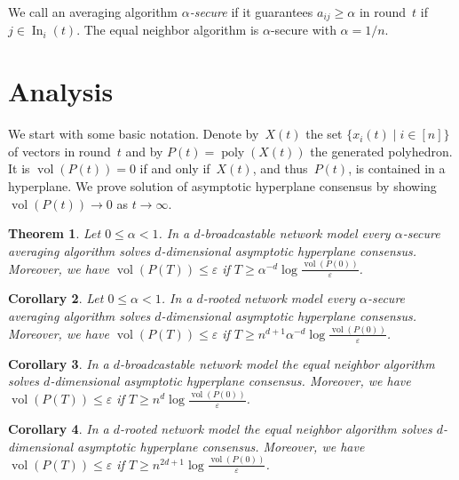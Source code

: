 \documentclass{article}
\newtheorem{thm}{Theorem}
\newtheorem{cor}[thm]{Corollary}
\DeclareMathOperator{\vol}{vol}
\renewcommand{\leq}{\leqslant}
\renewcommand{\geq}{\geqslant}
\DeclareMathOperator\In{In}
\DeclareMathOperator\poly{poly}
\begin{document}

We call an averaging algorithm \emph{$\alpha$-secure} if it guarantees
$a_{ij}\geq \alpha$ in round~$t$ if $j\in \In_i(t)$.
The equal neighbor algorithm is $\alpha$-secure with $\alpha = 1/n$.
  


\section{Analysis}\label{sec:analysis}

We start with some basic notation.
Denote by~$X(t)$ the set
$\{ x_i(t) \mid i \in [n] \}$
of vectors in round~$t$
and 
by
$P(t) = \poly(X(t))$ the generated polyhedron.
It is $\vol(P(t)) = 0$ if and only if~$X(t)$, and thus~$P(t)$, is contained in a hyperplane.
We prove solution of asymptotic hyperplane consensus by showing $\vol(P(t)) \to 0$ as $t\to\infty$.

\begin{thm}\label{thm:poss}
Let $0\leq \alpha < 1$.
In a $d$-broadcastable network model every $\alpha$-secure averaging algorithm solves $d$-dimensional asymptotic hyperplane consensus.
Moreover, we have $\vol(P(T)) \leq \varepsilon$ if $T \geq \alpha^{-d} \log \frac{\vol(P(0))}{\varepsilon}$.
\end{thm}

\begin{cor}
Let $0\leq \alpha < 1$.
In a $d$-rooted network model every $\alpha$-secure averaging algorithm solves $d$-dimensional asymptotic hyperplane consensus.
Moreover, we have $\vol(P(T)) \leq \varepsilon$ if $T \geq n^{d+1} \alpha^{-d} \log \frac{\vol(P(0))}{\varepsilon}$.
\end{cor}

\begin{cor}
In a $d$-broadcastable network model the equal neighbor algorithm solves $d$-dimensional asymptotic hyperplane consensus.
Moreover, we have $\vol(P(T)) \leq \varepsilon$ if $T \geq n^d \log \frac{\vol(P(0))}{\varepsilon}$.
\end{cor}

\begin{cor}
In a $d$-rooted network model the equal neighbor algorithm solves $d$-dimensional asymptotic hyperplane consensus.
Moreover, we have $\vol(P(T)) \leq \varepsilon$ if $T \geq n^{2d+1} \log \frac{\vol(P(0))}{\varepsilon}$.
\end{cor}
\end{document}
